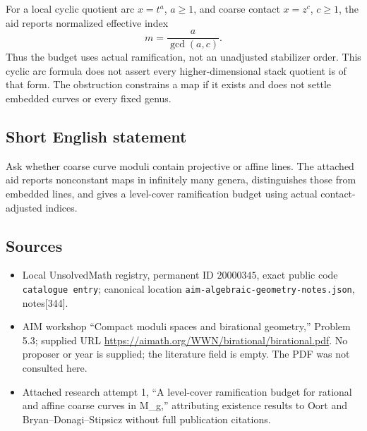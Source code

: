 \documentclass[11pt]{article}
\begin{document}
For a local cyclic quotient arc \(x=t^a\), \(a\geq1\), and coarse contact \(x=z^c\), \(c\geq1\), the aid reports normalized effective index
\[
m=\frac a{\gcd(a,c)}.
\]
Thus the budget uses actual ramification, not an unadjusted stabilizer order. This cyclic arc formula does not assert every higher-dimensional stack quotient is of that form. The obstruction constrains a map if it exists and does not settle embedded curves or every fixed genus.
\subsection{Short English statement}
Ask whether coarse curve moduli contain projective or affine lines. The attached aid reports nonconstant maps in infinitely many genera, distinguishes those from embedded lines, and gives a level-cover ramification budget using actual contact-adjusted indices.
\subsection{Sources}
\begin{itemize}
\item Local UnsolvedMath registry, permanent ID \(20000345\), exact public code \texttt{catalogue entry}; canonical location \texttt{aim-algebraic-geometry-notes.json}, notes[344].
\item AIM workshop ``Compact moduli spaces and birational geometry,'' Problem 5.3; supplied URL \url{https://aimath.org/WWN/birational/birational.pdf}. No proposer or year is supplied; the literature field is empty. The PDF was not consulted here.
\item Attached research attempt 1, ``A level-cover ramification budget for rational and affine coarse curves in M\_g,'' attributing existence results to Oort and Bryan--Donagi--Stipsicz without full publication citations.
\end{itemize}
\end{document}
